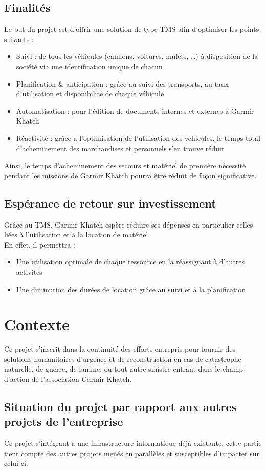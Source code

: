\documentclass[11pt,fleqn]{book} %
\begin{document}
\subsection{Finalités}
Le but du projet est d'offrir une solution de type TMS afin d'optimiser les points suivants :
\begin{itemize}
\item Suivi : de tous les véhicules (camions, voitures, mulets, …) à disposition de la société via une identification unique de chacun
\item Planification \& anticipation : grâce au suivi des transports, au taux d'utilisation et disponibilité de chaque véhicule
\item Automatisation : pour l'édition de documents internes et externes à Garmir Khatch
\item Réactivité : grâce à l'optimisation de l'utilisation des véhicules, le temps total d'acheminement des marchandises et personnels s'en trouve réduit
\end{itemize}
Ainsi, le temps d'acheminement des secours et matériel de première nécessité pendant les missions de Garmir Khatch pourra être réduit de façon significative.

\subsection{Espérance de retour sur investissement}
Grâce au TMS, Garmir Khatch espère réduire ses dépenses en particulier celles liées à l'utilisation et à la location de matériel.
\\
En effet, il permettra :
\begin{itemize}
\item Une utilisation optimale de chaque ressource en la réassignant à d'autres activités
\item Une diminution des durées de location grâce au suivi et à la planification
\end{itemize}

\section{Contexte}
Ce projet s'inscrit dans la continuité des efforts entrepris pour fournir des solutions humanitaires d'urgence et de reconstruction en cas de catastrophe naturelle, de guerre, de famine, ou tout autre sinistre entrant dans le champ d'action de l'association Garmir Khatch.

\subsection{Situation du projet par rapport aux autres projets de l'entreprise}
Ce projet s'intégrant à une infrastructure informatique déjà existante, cette partie tient compte des autres projets menés en parallèles et susceptibles d'impacter sur celui-ci.
\end{document}
